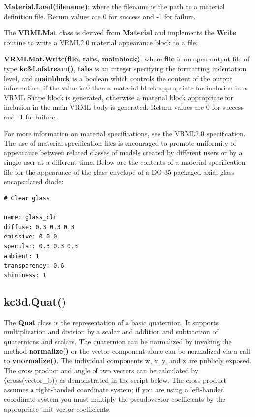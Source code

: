 \textbf{Material.Load(filename)}: where the filename is the path to a
material definition file. Return values are 0 for success and -1 for failure.

The \textbf{VRMLMat} class is derived from \textbf{Material} and implements
the \textbf{Write} routine to write a VRML2.0 material appearance block to
a file:

\textbf{VRMLMat.Write(file, tabs, mainblock)}: where \textbf{file} is an open
output file of type \textbf{kc3d.ofstream()}, \textbf{tabs} is an integer
specifying the formatting indentation level, and \textbf{mainblock} is a boolean
which controls the content of the output information; if the value is 0 then
a material block appropriate for inclusion in a VRML Shape block is generated,
otherwise a material block appropriate for inclusion in the main VRML body
is generated.  Return values are 0 for success and -1 for failure.

For more information on material specifications, see the VRML2.0 specification.
The use of material specification files is encouraged to promote uniformity of
appearance between related classes of models created by different users or by
a single user at a different time. Below are the contents of a material
specification file for the appearance of the glass envelope of a DO-35 packaged
axial glass encapsulated diode:

\begin{verbatim}
# Clear glass

name: glass_clr
diffuse: 0.3 0.3 0.3
emissive: 0 0 0
specular: 0.3 0.3 0.3
ambient: 1
transparency: 0.6
shininess: 1
\end{verbatim}

\subsection{kc3d.Quat()}
The \textbf{Quat} class is the representation of a basic quaternion. It supports
multiplication and division by a scalar and addition and subtraction of quaternions
and scalars. The quaternion can be normalized by invoking the method \textbf{normalize()}
or the vector component alone can be normalized via a call to \textbf{vnormalize()}.
The individual components w, x, y, and z are publicly exposed. The cross product
and angle of two vectors can be calculated by \textbf(cross(vector\_b)) as demonstrated
in the script below. The cross product assumes a right-handed coordinate system; if
you are using a left-handed coordinate system you must multiply the pseudovector
coefficients by the appropriate unit vector coefficients.

